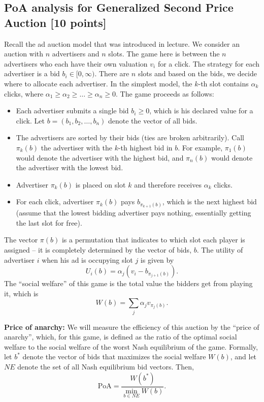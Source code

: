 \documentclass[11pt]{article}
\begin{document}
\subsection{PoA analysis for Generalized Second Price Auction [10 points]}

Recall the ad auction model that was introduced in lecture. We consider an auction with $n$ advertisers and $n$ slots. The game here is between the $n$ advertisers who each have their own valuation $v_i$ for a click. The strategy for each advertiser is a bid $b_i\in [0,\infty)$. There are $n$ slots and based on the bids, we decide where to allocate each advertiser. In the simplest model, the $k$-th slot contains $\alpha_k$ clicks, where $\alpha_1\ge\alpha_2\ge\ldots\ge\alpha_n\ge0$. The game proceeds as follows:
\begin{itemize}
\item Each advertiser submits a single bid $b_i\geq 0$, which is his declared value for a click. Let $b=(b_1,b_2,\ldots,b_n)$ denote the vector of all bids.
\item The advertisers are sorted by their bids (ties are broken arbitrarily). Call $\pi_k(b)$ the advertiser with the $k$-th highest bid in $b$. For example, $\pi_1(b)$ would denote the advertiser with the highest bid, and $\pi_n(b)$ would denote the advertiser with the lowest bid.
\item Advertiser $\pi_k(b)$ is placed on slot $k$ and therefore receives $\alpha_k$ clicks.
\item For each click, advertiser $\pi_k(b)$ pays $b_{\pi_{k+1}(b)}$, which is the next highest bid (assume that the lowest bidding advertiser pays nothing, essentially getting the last slot for free).
\end{itemize}
The vector $\pi(b)$ is a permutation that indicates to which slot each player is assigned -- it is completely determined by the vector of bids, $b$. The utility of advertiser $i$ when his ad is occupying slot $j$ is given by $$U_i(b)=\alpha_j(v_i-b_{\pi_{j+1}(b)}).$$
The ``social welfare'' of this game is the total value the bidders get from playing it, which is
$$
W(b)=\sum_j\alpha_jv_{\pi_j(b)}.
$$

\noindent\textbf{Price of anarchy:} We will measure the efficiency of this auction by the ``price of anarchy'', which, for this game, is defined as the ratio of the optimal social welfare to the social welfare of the worst Nash equilibrium of the game. Formally, let $b^*$ denote the vector of bids that maximizes the social welfare $W(b)$, and let $N\!E$ denote the set of all Nash equilibrium bid vectors. Then,
\begin{equation*}
\textrm{PoA}=\frac{W(b^*)}{\displaystyle\min_{b\in N\!E}W(b)}.
\end{equation*}
\end{document}
